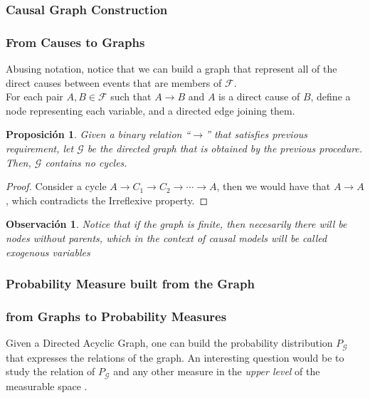 \documentclass{beamer}
\theoremstyle{plain}
\newtheorem{prop}[teo]{Proposición}
\newtheorem{obs}[teo]{Observación}
\begin{document}
		\subsubsection{Causal Graph Construction}
		\begin{frame}
		\frametitle{From Causes to Graphs}
		Abusing notation, notice that we can build a graph that represent all of the direct causes between events that are members of $\mathcal{F}$.\\
		For each pair $A,B \in \mathcal{F}$ such that $A \to B$ and $A$ is a direct cause of $B$, define a node representing each variable, and a directed edge joining them.
		\begin{prop}
		Given a binary relation “$\to$” that satisfies previous requirement, let $\mathcal{G}$ be the directed graph that is obtained by the previous procedure. Then, $\mathcal{G}$ contains no cycles.
		\end{prop}
		\begin{proof}
		Consider a cycle $A \to C_1 \to C_2 \to \cdots \to A$, then we would have that $A \to A$, which contradicts the Irreflexive property.
		\end{proof}
		\end{frame}
		\begin{frame}
		\begin{obs}
		Notice that if the graph is finite, then necesarily there will be nodes without parents, which in the context of causal models will be called exogenous variables
		\end{obs}
		\end{frame}
		\subsubsection{Probability Measure built from the Graph}
		\begin{frame}
		\frametitle{from Graphs to Probability Measures}
		Given a Directed Acyclic Graph, one can build the probability distribution $P_\mathcal{G}$ that expresses the relations of the graph.
		An interesting question would be to study the relation of $P_\mathcal{G}$ and any other measure in the \textit{upper level} of the measurable space .
		\end{frame}
\end{document}
